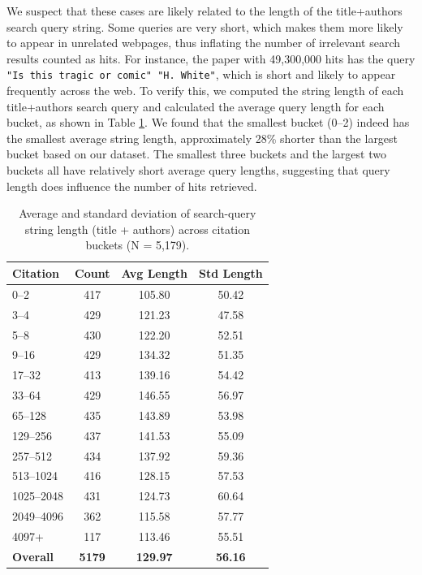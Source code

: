 \documentclass[11pt]{article}
\begin{document}
We suspect that these cases are likely related to the length of the title+authors search query string. Some queries are very short, which makes them more likely to appear in unrelated webpages, thus inflating the number of irrelevant search results counted as hits. For instance, the paper with 49,300,000 hits has the query \texttt{"Is this tragic or comic" "H. White"}, which is short and likely to appear frequently across the web. To verify this, we computed the string length of each title+authors search query and calculated the average query length for each bucket, as shown in Table \ref{tab:query_length_full}. We found that the smallest bucket (0–2) indeed has the smallest average string length, approximately 28\% shorter than the largest bucket based on our dataset. The smallest three buckets and the largest two buckets all have relatively short average query lengths, suggesting that query length does influence the number of hits retrieved.

\begin{table}[h!]
\setlength{\tabcolsep}{1pt}
\centering

\begin{tabular}{lccc}
\toprule
\textbf{Citation} & \textbf{Count} &
\textbf{Avg Length} & \textbf{Std Length} \\
\midrule
0--2 & 417 & 105.80 & 50.42 \\
3--4 & 429 & 121.23 & 47.58 \\
5--8 & 430 & 122.20 & 52.51 \\
9--16 & 429 & 134.32 & 51.35 \\
17--32 & 413 & 139.16 & 54.42 \\
33--64 & 429 & 146.55 & 56.97 \\
65--128 & 435 & 143.89 & 53.98 \\
129--256 & 437 & 141.53 & 55.09 \\
257--512 & 434 & 137.92 & 59.36 \\
513--1024 & 416 & 128.15 & 57.53 \\
1025--2048 & 431 & 124.73 & 60.64 \\
2049--4096 & 362 & 115.58 & 57.77 \\
4097+ & 117 & 113.46 & 55.51 \\
\midrule
\textbf{Overall} & \textbf{5179} & \textbf{129.97} & \textbf{56.16} \\
\bottomrule
\end{tabular}
\caption{Average and standard deviation of search-query string length (title + authors) across citation buckets (N = 5,179).}
\label{tab:query_length_full}
\end{table}
\end{document}
